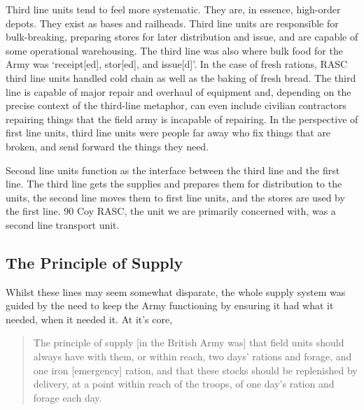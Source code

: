 \documentclass[noraggedright]{turabian-researchpaper}
\begin{document}
Third line units tend to feel more systematic.  They are, in essence, 
high-order depots.  They exist as bases and railheads.  Third line units 
are responsible for bulk-breaking, preparing stores for later distribution 
and issue, and are capable of some operational 
warehousing.\autocite [s. 105(2)]{FSR1} 
The third line was also where bulk food for the Army was `receipt[ed], 
stor[ed], and issue[d]'. %
In the case of fresh rations, RASC third line units 
handled cold chain as well as the baking of fresh bread.\autocite
[RASCOrg][2]{pope-pp} The third line is capable of major 
repair and overhaul of equipment and, depending on the precise context of the 
third-line metaphor, can even include civilian contractors repairing things
that the field army is incapable of repairing.  In the perspective of first 
line units, third line units were people far away who fix things that are 
broken, and send forward the things they need.

Second line units function as the interface between the third line and the
first line.\autocite[s. 101]{FSR1}  The third line gets the supplies and 
prepares them for distribution to the units, the second line moves them to 
first line units, and the stores are used by the first line.  90 Coy RASC, 
the unit we are primarily concerned with, was a second line transport unit.

\subsection{The Principle of Supply}

Whilst these lines may seem somewhat disparate, the whole supply system was 
guided by the need to keep the Army functioning by ensuring it had what it 
needed, when it needed it.  At it's core,
\begin{quotation}
	The principle of supply [in the British Army was] that field units 
	should always have with them, or within reach, two days' rations and 
	forage, and one iron [emergency] ration, and that these stocks 
	should be replenished by delivery, at a point within reach of the 
	troops, of one day's ration and forage each 
	day.\autocite[s. 107(1)]{FSR1}
	
\end{quotation}
\end{document}
